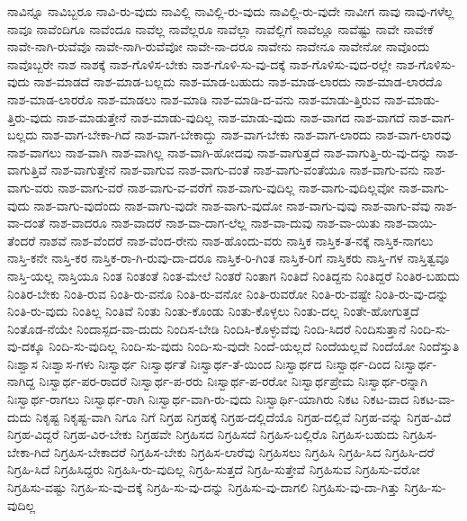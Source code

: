 {ನಾವಿನ್ನೂ
ನಾವಿಬ್ಬರೂ
ನಾವಿ-ರು-ವುದು
ನಾವಿಲ್ಲಿ
ನಾವಿಲ್ಲಿ-ರು-ವುದು
ನಾವಿಲ್ಲಿ-ರು-ವುದೇ
ನಾವೀಗ
ನಾವು
ನಾವು-ಗಳೆಲ್ಲ
ನಾವೂ
ನಾವೆಂದಿಗೂ
ನಾವೆಂದೂ
ನಾವೆಲ್ಲ
ನಾವೆಲ್ಲರೂ
ನಾವೆಲ್ಲಾ
ನಾವೆಲ್ಲಿಗೆ
ನಾವೆಲ್ಲೂ
ನಾವೆಷ್ಟು
ನಾವೇ
ನಾವೇಕೆ
ನಾವೇ-ನಾಗಿ-ರುವೆವೊ
ನಾವೇ-ನಾಗಿ-ರುವೆವೋ
ನಾವೇ-ನಾ-ದರೂ
ನಾವೇನು
ನಾವೇನೂ
ನಾವೇನೋ
ನಾವೊಂದು
ನಾವೊಬ್ಬರೇ
ನಾಶ
ನಾಶಕ್ಕೆ
ನಾಶ-ಗೊಳಿಸ-ಬೇಕು
ನಾಶ-ಗೊಳಿ-ಸು-ವು-ದಕ್ಕೆ
ನಾಶ-ಗೊಳಿಸು-ವುದ-ರಲ್ಲೇ
ನಾಶ-ಗೊಳಿಸು-ವುದು
ನಾಶ-ಮಾಡದೆ
ನಾಶ-ಮಾಡ-ಬಲ್ಲದು
ನಾಶ-ಮಾಡ-ಬಹುದು
ನಾಶ-ಮಾಡ-ಲಾರದು
ನಾಶ-ಮಾಡ-ಲಾರದೊ
ನಾಶ-ಮಾಡ-ಲಾರರೊ
ನಾಶ-ಮಾಡಲು
ನಾಶ-ಮಾಡಿ
ನಾಶ-ಮಾಡಿ-ದ-ವನು
ನಾಶ-ಮಾಡು-ತ್ತಿರುವ
ನಾಶ-ಮಾಡು-ತ್ತಿರು-ವುದು
ನಾಶ-ಮಾಡುತ್ತೇನೆ
ನಾಶ-ಮಾಡು-ವುದಿಲ್ಲ
ನಾಶ-ಮಾಡು-ವುದು
ನಾಶ-ವಾಗದ
ನಾಶ-ವಾಗದೆ
ನಾಶ-ವಾಗ-ಬಲ್ಲದು
ನಾಶ-ವಾಗ-ಬೇಕಾ-ಗಿದೆ
ನಾಶ-ವಾಗ-ಬೇಕಾದ್ದು
ನಾಶ-ವಾಗ-ಬೇಕು
ನಾಶ-ವಾಗ-ಲಾರದು
ನಾಶ-ವಾಗ-ಲಾರವು
ನಾಶ-ವಾಗಲು
ನಾಶ-ವಾಗಿ
ನಾಶ-ವಾಗಿಲ್ಲ
ನಾಶ-ವಾಗಿ-ಹೋದವು
ನಾಶ-ವಾಗುತ್ತದೆ
ನಾಶ-ವಾಗುತ್ತಿ-ರು-ವು-ದನ್ನು
ನಾಶ-ವಾಗುತ್ತಿವೆ
ನಾಶ-ವಾಗುತ್ತೇನೆ
ನಾಶ-ವಾಗುವ
ನಾಶ-ವಾಗು-ವಂತೆ
ನಾಶ-ವಾಗು-ವಂತೆಯೂ
ನಾಶ-ವಾಗು-ವನು
ನಾಶ-ವಾಗು-ವರು
ನಾಶ-ವಾಗು-ವರೆ
ನಾಶ-ವಾಗು-ವ-ವರೆಗೆ
ನಾಶ-ವಾಗು-ವುದಿಲ್ಲ
ನಾಶ-ವಾಗು-ವುದಿಲ್ಲವೋ
ನಾಶ-ವಾಗು-ವುದು
ನಾಶ-ವಾಗು-ವುದೆಂದು
ನಾಶ-ವಾಗು-ವುದೇ
ನಾಶ-ವಾಗು-ವುದೋ
ನಾಶ-ವಾಗು-ವುವು
ನಾಶ-ವಾಗು-ವೆವು
ನಾಶ-ವಾ-ದಂತೆ
ನಾಶ-ವಾದರೂ
ನಾಶ-ವಾದರೆ
ನಾಶ-ವಾ-ದಾಗ-ಲೆಲ್ಲ
ನಾಶ-ವಾ-ದುವು
ನಾಶ-ವಾ-ಯಿತು
ನಾಶ-ವಾಯಿ-ತೆಂದರೆ
ನಾಶವೆ
ನಾಶ-ವೆಂದರೆ
ನಾಶ-ವೆಂದ-ರೇನು
ನಾಶ-ಹೊಂದು-ವರು
ನಾಸ್ತಿಕ
ನಾಸ್ತಿಕ-ತ-ನಕ್ಕೆ
ನಾಸ್ತಿಕ-ನಾಗಲು
ನಾಸ್ತಿ-ಕನೇ
ನಾಸ್ತಿ-ಕರ
ನಾಸ್ತಿಕ-ರಾ-ಗಿ-ರುವು-ದಾ-ದರೂ
ನಾಸ್ತಿಕ-ರಿ-ಗಿಂತ
ನಾಸ್ತಿಕ-ರಿಗೆ
ನಾಸ್ತಿಕರು
ನಾಸ್ತಿ-ಗಳ
ನಾಸ್ತಿತ್ವವೂ
ನಾಸ್ತಿ-ಯಲ್ಲ
ನಾಸ್ತಿಯೂ
ನಿಂತ
ನಿಂತಂತೆ
ನಿಂತ-ಮೇಲೆ
ನಿಂತರೆ
ನಿಂತಾಗ
ನಿಂತಿದೆ
ನಿಂತಿದ್ದನು
ನಿಂತಿದ್ದರೆ
ನಿಂತಿರ-ಬಹುದು
ನಿಂತಿರ-ಬೇಕು
ನಿಂತಿ-ರುವ
ನಿಂತಿ-ರು-ವನೊ
ನಿಂತಿ-ರು-ವನೋ
ನಿಂತಿ-ರುವರೋ
ನಿಂತಿ-ರು-ವಷ್ಟೇ
ನಿಂತಿ-ರು-ವು-ದನ್ನು
ನಿಂತಿ-ರು-ವುದು
ನಿಂತಿಲ್ಲ
ನಿಂತಿವೆ
ನಿಂತು
ನಿಂತು-ಕೊಂಡು
ನಿಂತು-ಕೊಳ್ಳಲು
ನಿಂತು-ದಲ್ಲ
ನಿಂತೇ-ಹೋಗುತ್ತದೆ
ನಿಂತೊಡ-ನೆಯೇ
ನಿಂದಾಸ್ಪದ-ವಾ-ದುದು
ನಿಂದಿಸ-ಬೇಡಿ
ನಿಂದಿಸಿ-ಕೊಳ್ಳುವೆವು
ನಿಂದಿ-ಸಿದರೆ
ನಿಂದಿಸುತ್ತಾನೆ
ನಿಂದಿ-ಸು-ವು-ದಕ್ಕೂ
ನಿಂದಿ-ಸು-ವುದಿಲ್ಲ
ನಿಂದಿ-ಸು-ವುದು
ನಿಂದಿ-ಸು-ವುದೇ
ನಿಂದೆ-ಯಲ್ಲದೆ
ನಿಂದೆಯಲ್ಲವೆ
ನಿಂದೆಯೋ
ನಿಂದೆಸ್ತುತಿ
ನಿಃಶ್ವಾಸ
ನಿಃಶ್ವಾಸ-ಗಳು
ನಿಃಸ್ವಾರ್ಥ
ನಿಃಸ್ವಾರ್ಥತೆ
ನಿಃಸ್ವಾರ್ಥ-ತೆ-ಯಿಂದ
ನಿಃಸ್ವಾರ್ಥದ
ನಿಃಸ್ವಾರ್ಥ-ದಿಂದ
ನಿಃಸ್ವಾರ್ಥ-ನಾಗಿದ್ದ
ನಿಃಸ್ವಾರ್ಥ-ಪರ-ರಾದರೆ
ನಿಃಸ್ವಾರ್ಥ-ಪ-ರರು
ನಿಃಸ್ವಾರ್ಥ-ಪ-ರರೋ
ನಿಃಸ್ವಾರ್ಥಪ್ರೇಮ
ನಿಃಸ್ವಾರ್ಥ-ರನ್ನಾಗಿ
ನಿಃಸ್ವಾರ್ಥ-ರಾಗಲು
ನಿಃಸ್ವಾರ್ಥ-ರಾಗಿ
ನಿಃಸ್ವಾರ್ಥ-ವಾಗಿ-ರು-ವುದು
ನಿಃಸ್ವಾರ್ಥಿ-ಯಾಗಿರು
ನಿಕಟ
ನಿಕಟ-ವಾದ
ನಿಕಟ-ವಾ-ದುದು
ನಿಕೃಷ್ಟ
ನಿಕೃಷ್ಟ-ವಾಗಿ
ನಿಗೂ
ನಿಗೆ
ನಿಗ್ರಹ
ನಿಗ್ರಹಕ್ಕೆ
ನಿಗ್ರಹ-ದಲ್ಲಿದೆಯೊ
ನಿಗ್ರಹ-ದಲ್ಲಿವೆ
ನಿಗ್ರಹ-ವನ್ನು
ನಿಗ್ರಹ-ವಿದೆ
ನಿಗ್ರಹ-ವಿದ್ದರೆ
ನಿಗ್ರಹ-ವಿರ-ಬೇಕು
ನಿಗ್ರಹವೇ
ನಿಗ್ರಹಿಸದ
ನಿಗ್ರಹಿಸದೆ
ನಿಗ್ರಹಿಸ-ಬಲ್ಲಿರೊ
ನಿಗ್ರಹಿಸ-ಬಹುದು
ನಿಗ್ರಹಿಸ-ಬೇಕಾ-ಗಿದೆ
ನಿಗ್ರಹಿಸ-ಬೇಕಾದರೆ
ನಿಗ್ರಹಿಸ-ಬೇಕು
ನಿಗ್ರಹಿಸ-ಲಾರೆವು
ನಿಗ್ರಹಿಸಲು
ನಿಗ್ರಹಿಸಿ
ನಿಗ್ರಹಿ-ಸಿದ
ನಿಗ್ರಹಿಸಿ-ದರೆ
ನಿಗ್ರಹಿ-ಸಿದೆ
ನಿಗ್ರಹಿಸಿದ್ದರು
ನಿಗ್ರಹಿಸಿ-ರು-ವುದಿಲ್ಲ
ನಿಗ್ರಹಿ-ಸುತ್ತದೆ
ನಿಗ್ರಹಿ-ಸುತ್ತೇವೆ
ನಿಗ್ರಹಿಸುವ
ನಿಗ್ರಹಿಸು-ವರೋ
ನಿಗ್ರಹಿಸು-ವಷ್ಟು
ನಿಗ್ರಹಿ-ಸು-ವು-ದಕ್ಕೆ
ನಿಗ್ರಹಿ-ಸು-ವು-ದನ್ನು
ನಿಗ್ರಹಿಸು-ವು-ದಾಗಲಿ
ನಿಗ್ರಹಿಸು-ವು-ದಾ-ಗಿತ್ತು
ನಿಗ್ರಹಿ-ಸು-ವುದಿಲ್ಲ
}
